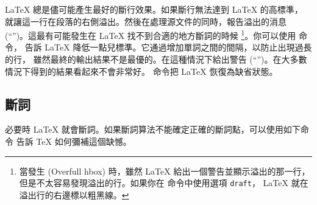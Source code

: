 \LaTeX{} 總是儘可能產生最好的斷行效果。如果斷行無法達到 \LaTeX{} 的高標準，
就讓這一行在段落的右側溢出。然後在處理源文件的同時，報告溢出的消息 
(``'')。這最有可能發生在 \LaTeX{} 找不到合適的地方斷詞的時候
\footnote{當發生 (Overfull
hbox) 時，雖然 \LaTeX{} 給出一個警告並顯示溢出的那一行，
但是不太容易發現溢出的行。如果你在  命令中使用選項 \texttt{draft}，
\LaTeX{} 就在溢出行的右邊標以粗黑線。}。你可以使用  命令，
告訴 \LaTeX{} 降低一點兒標準。它通過增加單詞之間的間隔，以防止出現過長的行，
雖然最終的輸出結果不是最優的。在這種情況下給出警告 (``'')。在大多數情況下得到的結果看起來不會非常好。
 命令把 \LaTeX{} 恢復為缺省狀態。

\subsection{斷詞} \label{hyph}

必要時 \LaTeX{} 就會斷詞。如果斷詞算法不能確定正確的斷詞點，可以使用如下命令
告訴 \TeX{} 如何彌補這個缺憾。

